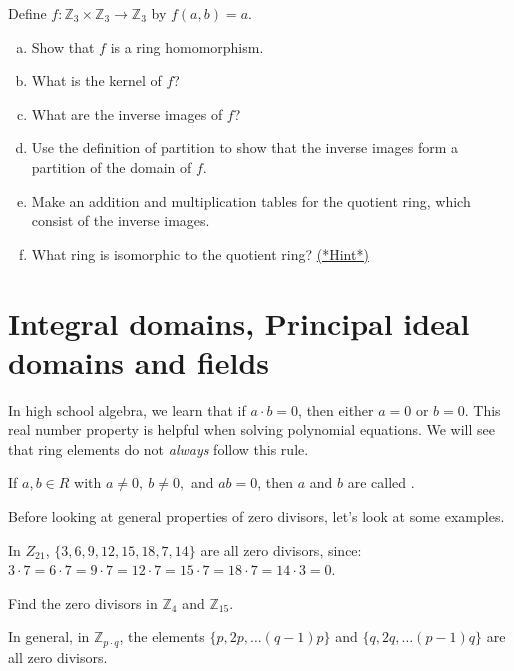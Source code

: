 \begin{exercise}\label{exercise:rings:Z3_homo}
Define $f:{\mathbb Z}_3\times {\mathbb Z}_3\rightarrow {\mathbb Z}_3$ by $f(a,b)=a$.
\begin{enumerate}[(a)]
\item Show that $f$ is a ring homomorphism.
\item What is the kernel of $f$?
\item What are the inverse images of $f$?
\item Use the definition of partition to show that the inverse images form a partition of the domain of $f$.
\item Make an addition and multiplication tables for the quotient ring, which consist of the inverse images.
\item What ring is isomorphic to the quotient ring?  \hyperref[ringsHints]{(*Hint*)} 
\end{enumerate}
\end{exercise}


\section{Integral domains, Principal ideal domains and fields}
\label{sec:IntegralDomainsPrincipalIdealDomains}

In high school algebra, we learn that if $a\cdot b=0$, then either $a=0$ or $b=0$.  This real number property is helpful when solving polynomial equations.  We will see that ring elements do not \emph{always} follow this rule.

\begin{defn}\label{zero_divisor}
If $a,b\in R$ with $a\neq 0,~b\neq 0,$ and $ab=0$, then $a$ and $b$ are called .
\end{defn}

Before looking at general properties of zero divisors, let's look at some examples.

\begin{example}\label{example:rings:Z21_zero_div}
In $Z_{21}$, $\{3,6,9,12,15,18,7,14\}$ are all zero divisors, since:
$3\cdot 7=6\cdot 7=9\cdot 7=12\cdot 7=15\cdot 7=18\cdot 7=14\cdot 3=0$.
\end{example}

\begin{exercise}
Find the zero divisors in ${\mathbb Z}_4$ and ${\mathbb Z}_{15}$.
\end{exercise}

In general, in ${\mathbb Z}_{p\cdot q}$, the elements $\{p,2p,\dots(q-1)p\}$ and $\{q,2q,\dots (p-1)q\}$ are all zero divisors.  

